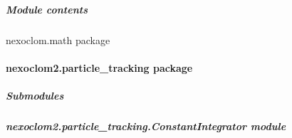 \documentclass[letterpaper,10pt,english]{sphinxmanual}
\begin{document}
\subparagraph{Module contents}
\label{\detokenize{nexoclom2/nexoclom2.math:module-nexoclom2.math}}\label{\detokenize{nexoclom2/nexoclom2.math:module-contents}}
\sphinxAtStartPar
nexoclom.math package

\sphinxstepscope


\paragraph{nexoclom2.particle\_tracking package}
\label{\detokenize{nexoclom2/nexoclom2.particle_tracking:nexoclom2-particle-tracking-package}}\label{\detokenize{nexoclom2/nexoclom2.particle_tracking::doc}}

\subparagraph{Submodules}
\label{\detokenize{nexoclom2/nexoclom2.particle_tracking:submodules}}
\sphinxstepscope


\subparagraph{nexoclom2.particle\_tracking.ConstantIntegrator module}
\label{\detokenize{nexoclom2/nexoclom2.particle_tracking.ConstantIntegrator:module-nexoclom2.particle_tracking.ConstantIntegrator}}\label{\detokenize{nexoclom2/nexoclom2.particle_tracking.ConstantIntegrator:nexoclom2-particle-tracking-constantintegrator-module}}\label{\detokenize{nexoclom2/nexoclom2.particle_tracking.ConstantIntegrator::doc}}
\end{document}
